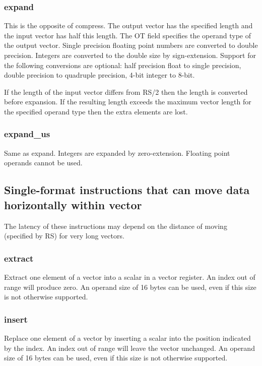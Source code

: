 \documentclass[forwardcom.tex]{subfiles}
\begin{document}
\subsubsection{expand}
This is the opposite of compress. The output vector has the specified length and the input vector has half this length. The OT field specifies the operand type of the output vector. Single precision floating point numbers are converted to double precision. Integers are converted to the double size by sign-extension. Support for the following conversions are optional: half precision float to single precision, double precision to quadruple precision, 4-bit integer to 8-bit.
\vspace{2mm}

If the length of the input vector differs from RS/2 then the length is converted before expansion. If the resulting length exceeds the maximum vector length for the specified operand type then the extra elements are lost.

\subsubsection{expand\_us}
Same as expand. Integers are expanded by zero-extension. Floating point operands cannot be used. 


\subsection{Single-format instructions that can move data horizontally within vector}
The latency of these instructions may depend on the distance of moving (specified by RS) for very long vectors.

\subsubsection{extract}
Extract one element of a vector into a scalar in a vector register. An index out of range will produce zero. An operand size of 16 bytes can be used, even if this size is not otherwise supported.

\subsubsection{insert}
Replace one element of a vector by inserting a scalar into the position indicated by the index. An index out of range will leave the vector unchanged. An operand size of 16 bytes can be used, even if this size is not otherwise supported.
\end{document}
